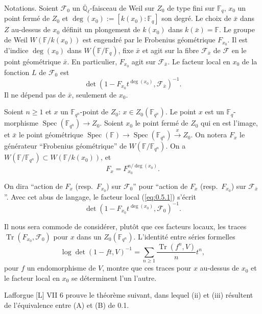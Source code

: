 \documentclass[11pt,a4paper]{article}
\theoremstyle{plain}
\theoremstyle{definition}
\DeclareMathOperator{\Spec}{Spec}
\DeclareMathOperator{\tr}{Tr}
\begin{document}
Notations. Soient $\mathcal{F}_0$ un $\overline{\mathbb{Q}}_\ell$-faisceau de Weil sur $Z_0$ de type fini sur $\mathbb{F}_q$, $x_0$ un point ferm\'e de $Z_0$ et $\deg(x_0) := [k(x_0):\mathbb{F}_q]$ son degr\'e. Le choix de $\bar{x}$ dans $Z$ au-dessus de $x_0$ d\'efinit un plongement de $k(x_0)$ dans $k(\bar{x}) = \mathbb{F}$. Le groupe de Weil $W(\mathbb{F}/k(x_0))$ est engendr\'e par le Frobenius g\'eom\'etrique $F_{x_0}$. Il est d'indice $\deg(x_0)$ dans $W(\mathbb{F}/\mathbb{F}_q)$, fixe $\bar{x}$ et agit sur la fibre $\mathcal{F}_{\bar{x}}$ de $\mathcal{F}$ en le point g\'eom\'etrique $\bar{x}$. En particulier, $F_{x_0}$ agit sur $\mathcal{F}_{\bar{x}}$. Le facteur local en $x_0$ de la fonction $L$ de $\mathcal{F}_0$ est
\begin{equation}\label{eq:0.5.1}
\det(1 - F_{x_0}t^{\deg(x_0)}, \mathcal{F}_{\bar{x}})^{-1}.
\end{equation}
Il ne d\'epend pas de $\bar{x}$, seulement de $x_0$.

Soient $n \geq 1$ et $x$ un $\mathbb{F}_{q^n}$-point de $Z_0$: $x \in Z_0(\mathbb{F}_{q^n})$. Le point $x$ est un $\mathbb{F}_q$-morphisme $\Spec(\mathbb{F}_{q^n}) \to Z_0$. Soient $x_0$ le point ferm\'e de $Z_0$ qui en est l'image, et $\bar{x}$ le point g\'eom\'etrique $\Spec(\mathbb{F}) \to \Spec(\mathbb{F}_{q^n}) \xrightarrow{x} Z_0$. On notera $F_x$ le g\'en\'erateur ``Frobenius g\'eom\'etrique'' de $W(\mathbb{F}/\mathbb{F}_{q^n})$. On a $W(\mathbb{F}/\mathbb{F}_{q^n}) \subset W(\mathbb{F}/k(x_0))$, et
\begin{equation}\label{eq:0.5.2}
F_x = F_{x_0}^{n/\deg(x_0)}.
\end{equation}

On dira ``action de $F_x$ (resp.~$F_{x_0}$) sur $\mathcal{F}_0$'' pour ``action de $F_x$ (resp.~$F_{x_0}$) sur $\mathcal{F}_{\bar{x}}$''. Avec cet abus de langage, le facteur local (\ref{eq:0.5.1}) s'\'ecrit
\[
\det(1 - F_{x_0}t^{\deg(x_0)}, \mathcal{F}_0)^{-1}.
\]

Il nous sera commode de consid\'erer, plut\^ot que ces facteurs locaux, les traces $\tr(F_{x_0},\mathcal{F}_0)$ pour $x$ dans un $Z_0(\mathbb{F}_{q^n})$. L'identit\'e entre s\'eries formelles
\[
\log \det(1 - ft, V)^{-1} = \sum_{n \geq 1} \frac{\tr(f^n,V)}{n} t^n,
\]
pour $f$ un endomorphisme de $V$, montre que ces traces pour $x$ au-dessus de $x_0$ et le facteur local en $x_0$ se d\'eterminent l'un l'autre.

Lafforgue [L] VII 6 prouve le th\'eor\`eme suivant, dans lequel (ii) et (iii) r\'esultent de l'\'equivalence entre (A) et (B) de 0.1.
\end{document}
